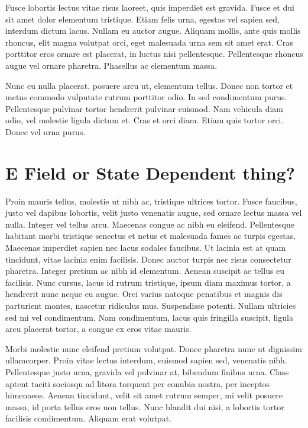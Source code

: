 Fusce lobortis lectus vitae risus laoreet, quis imperdiet est gravida. Fusce et dui sit amet dolor elementum tristique. Etiam felis urna, egestas vel sapien sed, interdum dictum lacus. Nullam eu auctor augue. Aliquam mollis, ante quis mollis rhoncus, elit magna volutpat orci, eget malesuada urna sem sit amet erat. Cras porttitor eros ornare est placerat, in luctus nisi pellentesque. Pellentesque rhoncus augue vel ornare pharetra. Phasellus ac elementum massa.

Nunc eu nulla placerat, posuere arcu ut, elementum tellus. Donec non tortor et metus commodo vulputate rutrum porttitor odio. In sed condimentum purus. Pellentesque pulvinar tortor hendrerit pulvinar euismod. Nam vehicula diam odio, vel molestie ligula dictum et. Cras et orci diam. Etiam quis tortor orci. Donec vel urna purus.

\section{E Field or State Dependent thing?}

Proin mauris tellus, molestie ut nibh ac, tristique ultrices tortor. Fusce faucibus, justo vel dapibus lobortis, velit justo venenatis augue, sed ornare lectus massa vel nulla. Integer vel tellus arcu. Maecenas congue ac nibh eu eleifend. Pellentesque habitant morbi tristique senectus et netus et malesuada fames ac turpis egestas. Maecenas imperdiet sapien nec lacus sodales faucibus. Ut lacinia est at quam tincidunt, vitae lacinia enim facilisis. Donec auctor turpis nec risus consectetur pharetra. Integer pretium ac nibh id elementum. Aenean suscipit ac tellus eu facilisis. Nunc cursus, lacus id rutrum tristique, ipsum diam maximus tortor, a hendrerit nunc neque eu augue. Orci varius natoque penatibus et magnis dis parturient montes, nascetur ridiculus mus. Suspendisse potenti. Nullam ultricies sed mi vel condimentum. Nam condimentum, lacus quis fringilla suscipit, ligula arcu placerat tortor, a congue ex eros vitae mauris.

Morbi molestie nunc eleifend pretium volutpat. Donec pharetra nunc ut dignissim ullamcorper. Proin vitae lectus interdum, euismod sapien sed, venenatis nibh. Pellentesque justo urna, gravida vel pulvinar at, bibendum finibus urna. Class aptent taciti sociosqu ad litora torquent per conubia nostra, per inceptos himenaeos. Aenean tincidunt, velit sit amet rutrum semper, mi velit posuere massa, id porta tellus eros non tellus. Nunc blandit dui nisi, a lobortis tortor facilisis condimentum. Aliquam erat volutpat.


